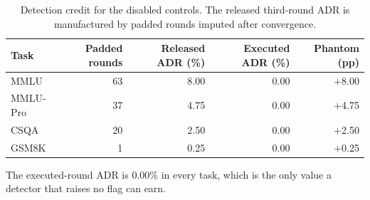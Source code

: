 \begin{table}[htbp]
\centering
\small
\caption{Detection credit for the disabled controls. The released third-round ADR is manufactured by padded rounds imputed after convergence.}
\label{tab:detection-credit}
\begin{tabular}{lrrrr}
\toprule
Task & Padded rounds & Released ADR (\%) & Executed ADR (\%) & Phantom (pp) \\
\midrule
MMLU & 63 & 8.00 & 0.00 & +8.00 \\
MMLU-Pro & 37 & 4.75 & 0.00 & +4.75 \\
CSQA & 20 & 2.50 & 0.00 & +2.50 \\
GSM8K & 1 & 0.25 & 0.00 & +0.25 \\
\bottomrule
\end{tabular}
\par\smallskip\footnotesize The executed-round ADR is 0.00\% in every task, which is the only value a detector that raises no flag can earn.
\end{table}
